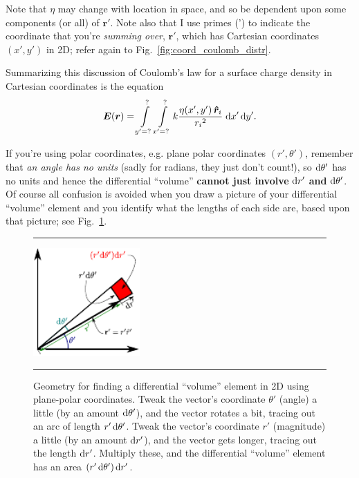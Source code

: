 \documentclass[10pt,letterpaper,twoside]{article}
\begin{document}
Note that $\eta$ may change with location in space, and so be dependent upon some components (or all) of $\bm r'$.
Note also that I use primes (') to indicate the coordinate that you're \textit{summing over}, $\bm{r'}$, which has Cartesian coordinates $(x',y')$ in 2D; refer again to Fig.~\ref{fig:coord_coulomb_distr}.

Summarizing this discussion of Coulomb's law for a surface charge density in Cartesian coordinates is the equation
\begin{equation}
  \bm E(\bm r) = \int\limits_{y'=?}^{?}\int\limits_{x'=?}^{?} k\frac{\eta(x',y')\,\bm{\hat r}_i}{{r_i}^2}\;\mathrm{d}x' \, \text d y'.\label{eqn:coulomb2}
\end{equation}

If you're using polar coordinates, e.g. plane polar coordinates $(r',\theta')$, remember that \textit{an angle has no units} (sadly for radians, they just don't count!), so $\text d \theta'$ has no units and hence the differential ``volume'' \textbf{cannot just involve} $\text d r'$ \textbf{and}  $\text d \theta'$.
Of course all confusion is avoided when you draw a picture of your differential ``volume'' element and you identify what the lengths of each side are, based upon that picture; see Fig.~\ref{fig:plane_polar_dr}.

\begin{figure}[htb]
  \centering
  \vspace{5pt}
  \hrule%
  \vspace{10pt}
	\centering
	\includegraphics[keepaspectratio=true,width=1.6in]{./plane_polar_dr.pdf}
    \caption{Geometry for finding a differential ``volume'' element in 2D using plane-polar coordinates.
	         Tweak the vector's coordinate $\theta'$ (angle) a little (by an amount $\text d \theta'$), and the vector rotates a bit, tracing out an arc of length $r'\,\text d\theta'$.
	         Tweak the vector's coordinate $r'$ (magnitude) a little (by an amount $\text d r'$), and the vector gets longer, tracing out the length $\text d r'$.
			 Multiply these, and the differential ``volume'' element has an area $\left( r'\,\text d \theta' \right)\text d r'$.}
    \label{fig:plane_polar_dr}
  \hrule%
\vspace{5pt}
\end{figure}
\end{document}
